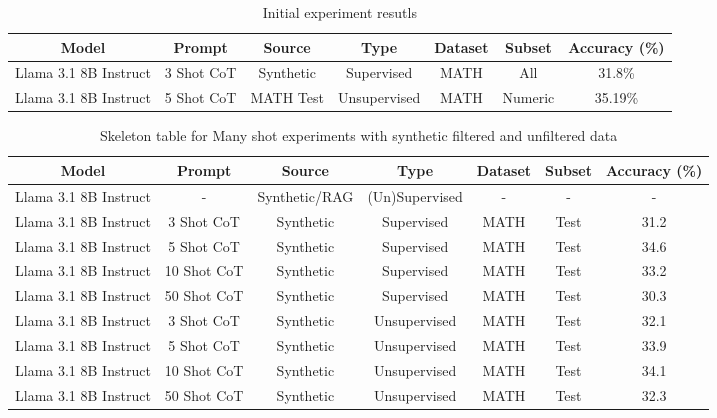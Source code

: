\documentclass[twocolumn,11pt]{article}
\begin{document}
\begin{table*}
    \centering
    \begin{tabular}{|c|c|c|c|c|c|c|}
        \hline
        \textbf{Model} & \textbf{Prompt} & \textbf{Source}  & \textbf{Type} & \textbf{Dataset} & \textbf{Subset} & \textbf{Accuracy (\%)}\\
        \hline
        Llama 3.1 8B Instruct & 3 Shot CoT & Synthetic & Supervised & MATH & All & 31.8\% \\
        \hline
        Llama 3.1 8B Instruct & 5 Shot CoT & MATH Test & Unsupervised & MATH & Numeric & 35.19\% \\
        \hline
    \end{tabular}
    \caption{Initial experiment resutls}
    \label{tab:experiment_results}
\end{table*}

\begin{table*}[!h]
    \centering
    \begin{tabular}{|c|c|c|c|c|c|c|}
        \hline
        \textbf{Model} & \textbf{Prompt} & \textbf{Source}  & \textbf{Type} & \textbf{Dataset} & \textbf{Subset} & \textbf{Accuracy (\%)}\\
        \hline
        Llama 3.1 8B Instruct & - & Synthetic/RAG & (Un)Supervised & - & - & - \\
        Llama 3.1 8B Instruct & 3 Shot CoT & Synthetic & Supervised & MATH & Test & 31.2 \\
        Llama 3.1 8B Instruct & 5 Shot CoT & Synthetic & Supervised & MATH & Test & 34.6 \\
        Llama 3.1 8B Instruct & 10 Shot CoT & Synthetic & Supervised & MATH & Test & 33.2 \\
        Llama 3.1 8B Instruct & 50 Shot CoT & Synthetic & Supervised & MATH & Test & 30.3 \\
        Llama 3.1 8B Instruct & 3 Shot CoT & Synthetic & Unsupervised & MATH & Test & 32.1 \\
        Llama 3.1 8B Instruct & 5 Shot CoT & Synthetic & Unsupervised & MATH & Test & 33.9 \\
        Llama 3.1 8B Instruct & 10 Shot CoT & Synthetic & Unsupervised & MATH & Test & 34.1 \\
        Llama 3.1 8B Instruct & 50 Shot CoT & Synthetic & Unsupervised & MATH & Test & 32.3 \\
        \hline
    \end{tabular}
    \caption{Skeleton table for Many shot experiments with synthetic filtered and unfiltered data}
    \label{tab:synth_experiment_results}
\end{table*}
\end{document}
